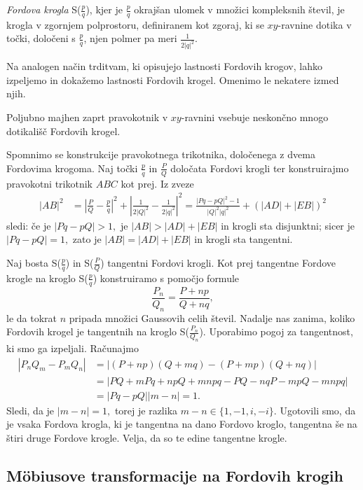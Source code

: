 \documentclass[mat1]{fmfdelo}
\begin{document}
\begin{definicija}
\emph{Fordova krogla} S($\frac{p}{q}$), kjer je $\frac{p}{q}$ okrajšan ulomek v množici kompleksnih števil, je krogla v zgornjem polprostoru, definiranem kot zgoraj, ki se $xy$-ravnine dotika v točki, določeni s $\frac{p}{q}$, njen polmer pa meri $\frac{1}{2|q|^2}.$
\end{definicija}

Na analogen način trditvam, ki opisujejo lastnosti Fordovih krogov, lahko izpeljemo in dokažemo lastnosti Fordovih krogel. Omenimo le nekatere izmed njih.

Poljubno majhen zaprt pravokotnik v $xy$-ravnini vsebuje neskončno mnogo dotikališč Fordovih krogel.

Spomnimo se konstrukcije pravokotnega trikotnika, določenega z dvema Fordovima krogoma. Naj točki $\frac{p}{q}$ in $\frac{P}{Q}$ določata Fordovi krogli ter konstruirajmo pravokotni trikotnik $ABC$ kot prej. Iz zveze
\begin{align*}
|AB|^2 
  &= \left |\frac{P}{Q} - \frac{p}{q} \right|^2 + \left |\frac{1}{2|Q|^2} - \frac{1}{2|q|^2} \right|^2 = \frac{|Pq-pQ|^2-1}{|Q|^2|q|^2} + (|AD| + |EB|)^2
\end{align*}
sledi:
če je $|Pq-pQ|>1,$ je $|AB|>|AD|+|EB|$ in krogli sta disjunktni;
sicer je $|Pq-pQ|=1,$ zato je $|AB|=|AD|+|EB|$ in krogli sta tangentni.

Naj bosta S($\frac{p}{q}$) in S($\frac{P}{Q}$) tangentni Fordovi krogli. Kot prej tangentne Fordove krogle na kroglo S($\frac{p}{q}$) konstruiramo s pomočjo formule
\[ \frac{P_n}{Q_n} = \frac{P+np}{Q+nq}, \]
le da tokrat $n$ pripada množici Gaussovih celih števil. 
Nadalje nas zanima, koliko Fordovih krogel je tangentnih na kroglo S($\frac{P_n}{Q_n}$).
Uporabimo pogoj za tangentnost, ki smo ga izpeljali. Računajmo
\begin{align*} 
|P_{n}Q_{m} - P_{m}Q_{n}| 
  &= |(P+np)(Q+mq) - (P+mp)(Q+nq)| \\
  &= |PQ+mPq+npQ+mnpq-PQ-nqP-mpQ-mnpq| \\
  &= |Pq-pQ| |m-n| = 1.
\end{align*}
%
Sledi, da je $|m-n|=1,$ torej je razlika $m-n \in \{1, -1, i, -i \}.$ Ugotovili smo, da je vsaka Fordova krogla, ki je tangentna na dano Fordovo kroglo, tangentna še na štiri druge Fordove krogle. Velja, da so te edine tangentne krogle.

\subsection{M\"{o}biusove transformacije na Fordovih krogih}
\end{document}
